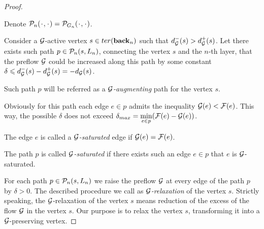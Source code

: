 \documentclass[12pt]{amsart}
\begin{document}
\begin{proof}
      \begin{definition*}
        Denote $\gnpaths(\makebox[1ex]{$\cdot$}, \makebox[1ex]{$\cdot$}) = \cal{P}_{G_n}(\makebox[1ex]{$\cdot$},\makebox[1ex]{$\cdot$})$.
      \end{definition*}
      Consider a $\cal{G}$-active vertex $s \in \ter(\eback_n)$ such that $d_{\cal{G}}^{-}(s) > d_{\cal{G}}^{+}(s)$.
      Let there exists such path $p \in \gnpaths(s, L_n)$, connecting the vertex $s$ and the $n$-th layer, that
        the preflow $\cal{G}$ could be increased along this path by some constant
        $\delta \leq d_{\cal{G}}^{-}(s) - d_{\cal{G}}^{+}(s) = -d_{\cal{G}}(s)$.
      \begin{definition}
        Such path $p$ will be referred as a \emph{$\cal{G}$-augmenting} path for the vertex $s$.
      \end{definition}
      Obviously for this path each edge $e \in p$ admits the inequality $\cal{G}(e) < \flowpos(e)$.
      This way, the possible $\delta$ does not exceed $\delta_{max}=\min\limits_{e \in p}(\flowpos(e) - \cal{G}(e))$.
      \begin{definition}
        The edge $e$ is called a \emph{$\cal{G}$-saturated} edge if $\cal{G}(e) = \flowpos(e)$.
      \end{definition}
      \begin{definition}
        The path $p$ is called \emph{$\cal{G}$-saturated} if there exists such an edge $e \in p$ that $e$ is $\cal{G}$-saturated.
      \end{definition}
      For each path $p \in \gnpaths(s, L_n)$ we raise the preflow $\cal{G}$ at every edge of the path $p$
      by $\delta > 0$.
      The described procedure we call as \emph{$\cal{G}$-relaxation} of the vertex $s$.
      Strictly speaking, the {$\cal{G}$-relaxation}
        of the vertex $s$ means reduction of the excess of the flow $\cal{G}$ in the vertex $s$.
      Our purpose is to relax the vertex $s$, transforming it into a $\cal{G}$-preserving vertex.


\end{proof}
\end{document}
